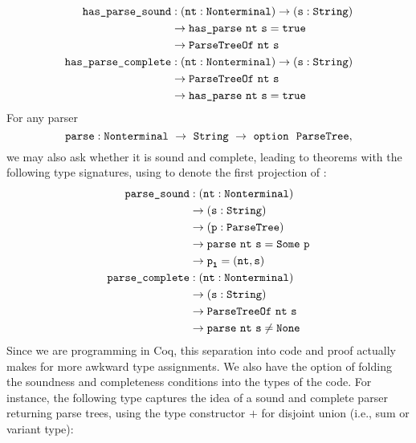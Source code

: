       \begin{align*}
        \fname{has\_parse\_sound} & \oftypesep
        (\oftype{\farg{nt}}{\Nonterminal})
        \typeto (\oftype{\farg{s}}{\String}) \\
        & \typeto \fname{has\_parse}~\farg{nt}~\farg{s} = \true \\
        & \typeto \indname{ParseTreeOf}~\farg{nt}~\farg{s} \\
        \fname{has\_parse\_complete} & \oftypesep
        (\oftype{\farg{nt}}{\Nonterminal})
        \typeto (\oftype{\farg{s}}{\String}) \\
        & \typeto \indname{ParseTreeOf}~\farg{nt}~\farg{s} \\
        & \typeto \fname{has\_parse}~\farg{nt}~\farg{s} = \true
      \end{align*}
      For any parser
      $$\oftype{\fname{parse}}{\Nonterminal~\typeto~\String~\typeto~\typeoption{\indname{ParseTree}}},$$
      we may also ask whether it is sound and complete, leading to theorems with the following type signatures, using  to denote the first projection of :
      \begin{align*}
        \fname{parse\_sound} & \oftypesep
        (\oftype{\farg{nt}}{\Nonterminal}) \\
        & \typeto (\oftype{\farg{s}}{\String}) \\
        & \typeto (\oftype{\farg{p}}{\indname{ParseTree}}) \\
        & \typeto \fname{parse}~\farg{nt}~\farg{s} = \Some{\farg{p}} \\
        & \typeto \proj1{\farg{p}} = (\farg{nt}, \farg{s}) \\
        \fname{parse\_complete} & \oftypesep
        (\oftype{\farg{nt}}{\Nonterminal}) \\
        & \typeto (\oftype{\farg{s}}{\String}) \\
        & \typeto \indname{ParseTreeOf}~\farg{nt}~\farg{s} \\
        & \typeto \fname{parse}~\farg{nt}~\farg{s} \neq \None
      \end{align*}
      Since we are programming in Coq, this separation into code and proof actually makes for more awkward type assignments.  We also have the option of folding the soundness and completeness conditions into the types of the code.  For instance, the following type captures the idea of a sound and complete parser returning parse trees, using the type constructor $+$ for disjoint union (i.e., sum or variant type):
